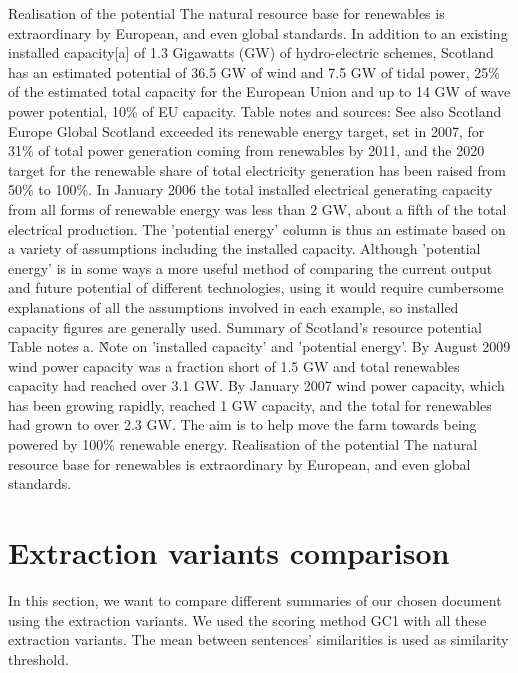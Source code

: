 \begin{tcolorbox}\footnotesize
	Realisation of the potential The natural resource base for renewables is extraordinary by European, and even global standards.
	In addition to an existing installed capacity[a] of 1.3 Gigawatts (GW) of hydro-electric schemes, Scotland has an estimated potential of 36.5 GW of wind and 7.5 GW of tidal power, 25\% of the estimated total capacity for the European Union and up to 14 GW of wave power potential, 10\% of EU capacity.
	Table notes and sources: See also Scotland Europe Global
	Scotland exceeded its renewable energy target, set in 2007, for 31\% of total power generation coming from renewables by 2011, and the 2020 target for the renewable share of total electricity generation has been raised from 50\% to 100\%.
	In January 2006 the total installed electrical generating capacity from all forms of renewable energy was less than 2 GW, about a fifth of the total electrical production.
	The 'potential energy' column is thus an estimate based on a variety of assumptions including the installed capacity.
	Although 'potential energy' is in some ways a more useful method of comparing the current output and future potential of different technologies, using it would require cumbersome explanations of all the assumptions involved in each example, so installed capacity figures are generally used.
	Summary of Scotland's resource potential Table notes a. \^ Note on 'installed capacity' and 'potential energy'.
	By August 2009 wind power capacity was a fraction short of 1.5 GW and total renewables capacity had reached over 3.1 GW.
	By January 2007 wind power capacity, which has been growing rapidly, reached 1 GW capacity, and the total for renewables had grown to over 2.3 GW.
	The aim is to help move the farm towards being powered by 100\% renewable energy.
	Realisation of the potential The natural resource base for renewables is extraordinary by European, and even global standards.
\end{tcolorbox}

\section{Extraction variants comparison}

In this section, we want to compare different summaries of our chosen document using the extraction variants.
We used the scoring method GC1 with all these extraction variants.
The mean between sentences' similarities is used as similarity threshold.

